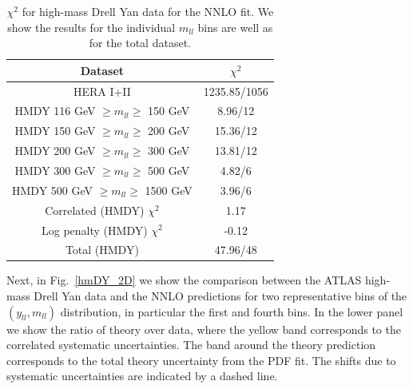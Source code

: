\begin{table}[t]
  \centering
  \begin{tabular}{|c|c|}
    \hline
    Dataset  &   $\chi^2$ \\
    \hline
    \hline
    HERA I+II & 1235.85/1056\\
    \hline
    HMDY  116 GeV $\ge m_{ll} \ge $ 150 GeV  &  8.96/12 \\
    HMDY  150 GeV $\ge m_{ll} \ge $ 200 GeV  &  15.36/12 \\
    HMDY  200 GeV $\ge m_{ll} \ge $ 300 GeV  &  13.81/12 \\
    HMDY  300 GeV $\ge m_{ll} \ge $ 500 GeV  &  4.82/6 \\
    HMDY  500 GeV $\ge m_{ll} \ge $ 1500 GeV &  3.96/6 \\
    \hline
    Correlated (HMDY) $\chi^2$ & 1.17 \\
    Log penalty (HMDY) $\chi^2$  & -0.12 \\
    \hline
    \hline
    Total  (HMDY) & 47.96/48 \\
    \hline
    \end{tabular}
  \caption{$\chi^{2}$ for high-mass Drell Yan data for the NNLO fit.
    We show the results for the individual $m_{ll}$ bins
    are well as for the total dataset.
\label{tab:chi2fit}
  }
\end{table}

Next, in Fig.~\ref{hmDY_2D} we show the comparison between the ATLAS
high-mass Drell Yan data and the NNLO predictions for two
representative bins of the $(y_{ll},m_{ll})$ distribution, in
particular the first and fourth bins.
%
In the lower panel we show the ratio of theory over data, where the
yellow band corresponds to the correlated systematic uncertainties.
%
The band around the theory prediction corresponds to the total theory
uncertainty from the PDF fit.
%
The shifts due to systematic uncertainties are indicated by a dashed
line.

